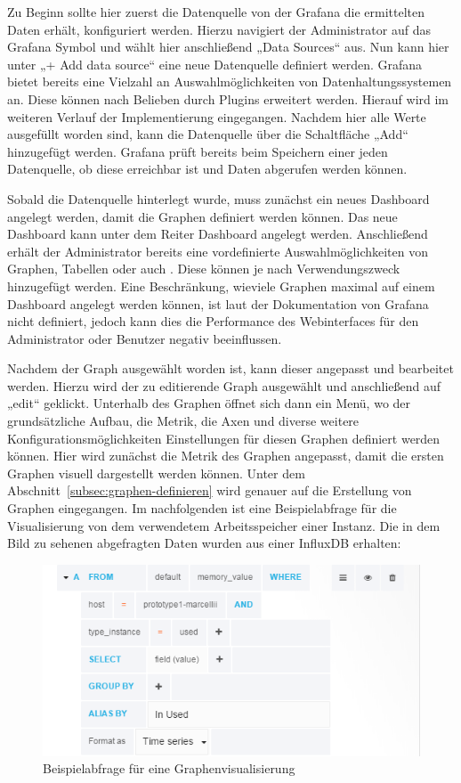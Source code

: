{Zu Beginn sollte hier zuerst die Datenquelle von der Grafana die ermittelten
Daten erhält, konfiguriert werden. Hierzu navigiert der Administrator auf das
Grafana Symbol und wählt hier anschließend „Data Sources“ aus. Nun kann hier
unter „+ Add data source“ eine neue Datenquelle definiert werden. Grafana
bietet bereits eine Vielzahl an Auswahlmöglichkeiten von Datenhaltungssystemen
an. Diese können nach Belieben durch Plugins erweitert werden. Hierauf wird im
weiteren Verlauf der Implementierung eingegangen. Nachdem hier alle Werte
ausgefüllt worden sind, kann die Datenquelle über die Schaltfläche „Add“
hinzugefügt werden. Grafana prüft bereits beim Speichern einer jeden
Datenquelle, ob diese erreichbar ist und Daten abgerufen werden können.

Sobald die Datenquelle hinterlegt wurde, muss zunächst ein neues Dashboard
angelegt werden, damit die Graphen definiert werden können. Das neue Dashboard
kann unter dem Reiter Dashboard angelegt werden. Anschließend erhält der
Administrator bereits eine vordefinierte Auswahlmöglichkeiten von Graphen,
Tabellen oder auch . Diese können je nach
Verwendungszweck hinzugefügt werden. Eine Beschränkung, wieviele Graphen
maximal auf einem Dashboard angelegt werden können, ist laut der Dokumentation
von Grafana nicht definiert, jedoch kann dies die Performance des Webinterfaces
für den Administrator oder Benutzer negativ beeinflussen.

Nachdem der Graph ausgewählt worden ist, kann dieser angepasst und bearbeitet
werden. Hierzu wird der zu editierende Graph ausgewählt und anschließend auf
„edit“ geklickt. Unterhalb des Graphen öffnet sich dann ein Menü, wo der
grundsätzliche Aufbau, die Metrik, die Axen und diverse weitere
Konfigurationsmöglichkeiten Einstellungen für diesen Graphen definiert werden
können. Hier wird zunächst die Metrik des Graphen angepasst, damit die ersten
Graphen visuell dargestellt werden können. Unter dem
Abschnitt~\ref{subsec:graphen-definieren} wird genauer auf die
Erstellung von Graphen eingegangen. Im nachfolgenden ist eine Beispielabfrage
für die Visualisierung von dem verwendetem Arbeitsspeicher einer Instanz. Die
in dem Bild zu sehenen abgefragten Daten wurden aus einer InfluxDB erhalten:

\begin{figure}[H]
  \centering
  \includegraphics[width=1.0\textwidth]{../figures/graph.png}
  \caption{Beispielabfrage für eine Graphenvisualisierung}
\label{figure:graph}
\end{figure}

}
